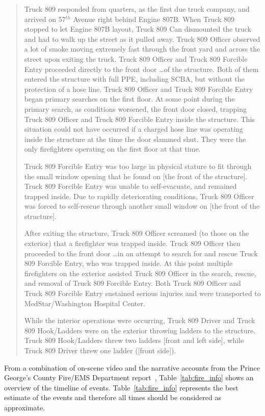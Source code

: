 \documentclass[12pt,oneside]{book}
\begin{document}
\begin{quote}
Truck 809 responded from quarters, as the first due truck company, and arrived on 57$^{th}$ Avenue right behind Engine 807B. When Truck 809 stopped to let Engine 807B layout, Truck 809 Can dismounted the truck and had to walk up the street as it pulled away. Truck 809 Officer observed a lot of smoke moving extremely fast through the front yard and across the street upon exiting the truck. Truck 809 Officer and Truck 809 Forcible Entry proceeded directly to the front door \ldots of the structure. Both of them entered the structure with full PPE, including SCBA, but without the protection of a hose line. Truck 809 Officer and Truck 809 Forcible Entry began primary searches on the first floor. At some point during the primary search, as conditions worsened, the front door closed, trapping Truck 809 Officer and Truck 809 Forcible Entry inside the structure. This situation could not have occurred if a charged hose line was operating inside the structure at the time the door slammed shut. They were the only firefighters operating on the first floor at that time. 

Truck 809 Forcible Entry was too large in physical stature to fit through the small window opening that he found on [the front of the structure]. Truck 809 Forcible Entry was unable to self-evacuate, and remained trapped inside. Due to rapidly deteriorating conditions, Truck 809 Officer was forced to self-rescue through another small window on [the front of the structure]. 

After exiting the structure, Truck 809 Officer screamed (to those on the exterior) that a firefighter was trapped inside. Truck 809 Officer then proceeded to the front door \ldots in an attempt to search for and rescue Truck 809 Forcible Entry, who was trapped inside. At this point multiple firefighters on the exterior assisted Truck 809 Officer in the search, rescue, and removal of Truck 809 Forcible Entry. Both Truck 809 Officer and Truck 809 Forcible Entry sustained serious injuries and were transported to MedStar/Washington Hospital Center. 

While the interior operations were occurring, Truck 809 Driver and Truck 809 Hook/Ladders were on the exterior throwing ladders to the structure. Truck 809 Hook/Ladders threw two ladders [front and left side], while Truck 809 Driver threw one ladder ([front side]). 
\end{quote}  
From a combination of on-scene video and the narrative accounts from the Prince George's County Fire/EMS Department report~\cite{PGCounty2013}, Table~\ref{tab:fire_info} shows an overview of the timeline of events. Table~\ref{tab:fire_info} represents the best estimate of the events and therefore all times should be considered as approximate.
\end{document}
